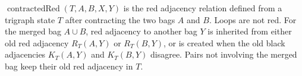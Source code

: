 \(\operatorname{contractedRed}(T,A,B,X,Y)\) is the red adjacency relation
defined from a trigraph state \(T\) after contracting the two bags \(A\) and
\(B\).  Loops are not red.  For the merged bag \(A\cup B\), red adjacency to
another bag \(Y\) is inherited from either old red adjacency
\(R_T(A,Y)\) or \(R_T(B,Y)\), or is created when the old black adjacencies
\(K_T(A,Y)\) and \(K_T(B,Y)\) disagree.  Pairs not involving the merged bag
keep their old red adjacency in \(T\).
